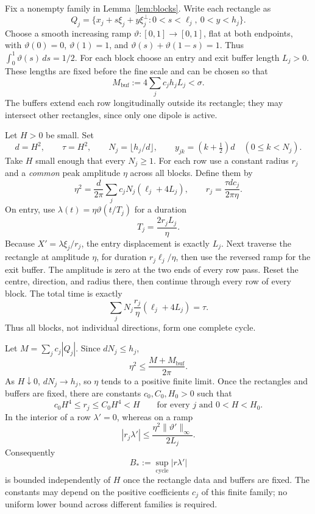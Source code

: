 \documentclass[11pt,a4paper,reqno]{amsart}
\theoremstyle{plain}
\theoremstyle{definition}
\theoremstyle{remark}
\numberwithin{equation}{section}
\begin{document}
Fix a nonempty family in Lemma~\ref{lem:blocks}. Write each rectangle
as
\[
 Q_j=\{x_j+s\xi_j+y\xi_j^\perp:0<s<\ell_j,\ 0<y<h_j\}.
\]
Choose a smooth increasing ramp $\vartheta:[0,1]\to[0,1]$, flat at
both endpoints, with $\vartheta(0)=0$, $\vartheta(1)=1$, and
$\vartheta(s)+\vartheta(1-s)=1$. Thus
$\int_0^1\vartheta(s)\,ds=1/2$.
For each block choose an entry and exit buffer length $L_j>0$.
These lengths are fixed before the fine scale and can be chosen so that
\begin{equation}\label{eq:buffer-mass}
 M_{\mathrm{buf}}:=4\sum_j c_jh_jL_j<\sigma.
\end{equation}
The buffers extend each row longitudinally outside its rectangle;
they may intersect other rectangles, since only one dipole is active.

Let $H>0$ be small. Set
\begin{equation}\label{eq:repair-scales}
 d=H^2,\qquad\tau=H^2,\qquad
 N_j=\lfloor h_j/d\rfloor,\qquad
 y_{jk}=(k+\tfrac12)d\quad(0\le k<N_j).
\end{equation}
Take $H$ small enough that every $N_j\ge1$.
For each row use a constant radius $r_j$ and a \emph{common} peak
amplitude $\eta$ across all blocks. Define them by
\begin{equation}\label{eq:exact-schedule}
 \eta^2=\frac d{2\pi}\sum_jc_jN_j
                (\ell_j+4L_j),
 \qquad
 r_j=\frac{\tau d c_j}{2\pi\eta}.
\end{equation}
On entry, use $\lambda(t)=\eta\vartheta(t/T_j)$ for a duration
\[
 T_j=\frac{2r_jL_j}{\eta}.
\]
Because $X'=\lambda\xi_j/r_j$, the entry displacement is exactly
$L_j$. Next traverse the rectangle at amplitude $\eta$, for duration
$r_j\ell_j/\eta$, then use the reversed ramp for the exit buffer.
The amplitude is zero at the two ends of every row pass. Reset the
centre, direction, and radius there, then continue through every row
of every block.
The total time is exactly
\begin{equation}\label{eq:duration-check}
 \sum_jN_j\frac{r_j}{\eta}
             (\ell_j+4L_j)=\tau.
\end{equation}
Thus all blocks, not individual directions, form one complete cycle.

Let $M=\sum_jc_j|Q_j|$. Since $dN_j\le h_j$,
\begin{equation}\label{eq:amplitude-bound}
 \eta^2\le\frac{M+M_{\mathrm{buf}}}{2\pi}.
\end{equation}
As $H\downarrow0$, $dN_j\to h_j$, so $\eta$ tends to a positive
finite limit. Once the rectangles and buffers are fixed, there are
constants $c_0,C_0,H_0>0$ such that
\begin{equation}\label{eq:radius-scale}
 c_0H^4\le r_j\le C_0H^4<H
 \qquad\text{for every }j\text{ and }0<H<H_0.
\end{equation}
In the interior of a row $\lambda'=0$, whereas on a ramp
\[
 |r_j\lambda'|\le
  \frac{\eta^2\|\vartheta'\|_\infty}{2L_j}.
\]
Consequently
\[
 B_*:=\sup_{\mathrm{cycle}}|r\lambda'|
\]
is bounded independently of $H$ once the rectangle data and buffers
are fixed. The constants may depend on the positive coefficients
$c_j$ of this finite family; no uniform lower bound across different
families is required.
\end{document}
